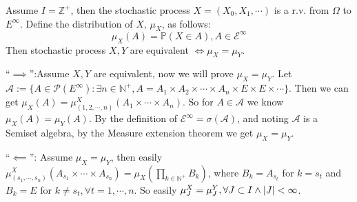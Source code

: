 \documentclass[../main]{subfiles}
\begin{document}
\begin{problem}\label{pro:6}
	Assume \(I=\mathbb{Z}^+\), then the stochastic process \(X=(X_0,X_1,\cdots)\) is a r.v. from \(\Omega\) to \(E^\infty\).
	Define the distribution of \(X\), \(\mu_X\), as follows:
	\[
		\mu_X(A)=\mathbb{P}(X \in A),A \in \mathscr{E}^\infty
	\]
	Then stochastic process \(X,Y\) are equivalent \(\iff \mu_X=\mu_Y\).
\end{problem}
\begin{solution}
	``\(\implies\)'':Assume \(X,Y\) are equivalent, now we will prove \(\mu_X=\mu_Y\).
	Let \(\mathscr{A}:=\{A \in \mathscr{P}(E^\infty):\exists n \in \mathbb{N}^+,A=A_1 \times A_2 \times \cdots \times A_n \times E \times E \times \cdots\}\).
	Then we can get \(\mu_X(A)=\mu^X_{(1,2,\cdots,n)}(A_1 \times \cdots \times A_n)\).
	So for \(A \in \mathscr{A}\) we know \(\mu_X(A)=\mu_Y(A)\).
	By the definition of \(\mathscr{E}^\infty=\sigma(\mathscr{A})\),
	and noting \(\mathscr{A}\) is a Semiset algebra, by the Measure extension theorem we get
	\(\mu_X=\mu_Y\).

	``\(\impliedby\)'': Assume \(\mu_X=\mu_Y\), then easily
	\(\mu^X_{(s_1,\cdots,s_n)}(A_{s_1} \times \cdots \times A_{s_n})=\mu_X(\prod_{k \in \mathbb{N}^+} B_k)\),
	where \(B_k=A_{s_t}\) for \(k=s_t\) and \(B_k=E\) for \(k \neq s_t,\forall t=1,\cdots,n\).
	So easily \(\mu^X_{J}=\mu^Y_{J},\forall J \subset I \wedge |J|<\infty\).
\end{solution}
\end{document}
